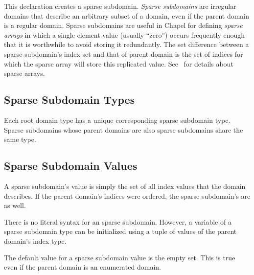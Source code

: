 This declaration creates a sparse subdomain.
 \emph{Sparse subdomains} are irregular domains that describe an
arbitrary subset of a domain, even if the parent domain is a regular
domain.  Sparse subdomains are useful in Chapel for
defining \emph{sparse arrays} in which a single element value (usually ``zero'')
 occurs
frequently enough that it is worthwhile to avoid storing it
redundantly.  The set difference between a sparse subdomain's index set
and that of parent domain is the set of indices for which the
sparse array will store this replicated value.
See~ for details about sparse arrays.

\subsection{Sparse Subdomain Types}

Each root domain type has a unique corresponding sparse subdomain
type.  Sparse subdomains whose parent domains are also sparse
subdomains share the same type.

\subsection{Sparse Subdomain Values}
\label{Sparse_Domain_Values}

A sparse subdomain's value is simply the set of all index values that
the domain describes.  If the parent domain's indices were ordered,
the sparse subdomain's are as well.

There is no literal syntax for an sparse subdomain.  However, a variable of a
sparse subdomain type can be initialized using a tuple of values
of the parent domain's index type.

The default value for a sparse subdomain value is the empty set.  This is true
even if the parent domain is an enumerated domain.

